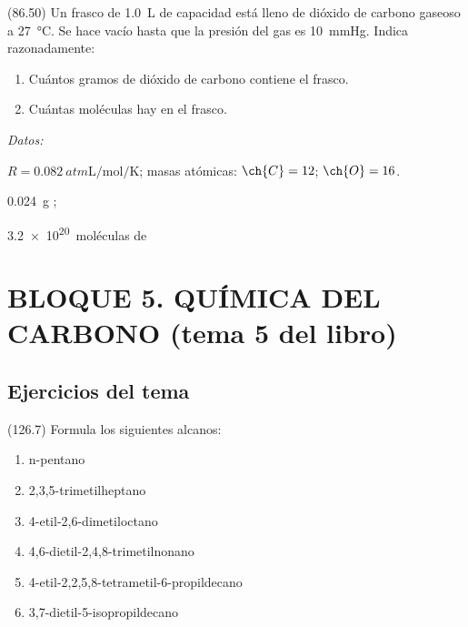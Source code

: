 \documentclass[10pt,a5paper,twoside]{article}
\newenvironment{gexdatos}{
      \vspace{4pt}
      \noindent\small\textit{Datos:}
    }{\vspace{5pt}}
\begin{document}
  \begin{exercise}[
      tags    = {},
      topics  = {química,química básica},
      source  = {FQ 1B MGH 2016, p86, e50},
    ]
    (86.50) Un frasco de \SI{1.0}{\liter} de capacidad está lleno de dióxido de carbono gaseoso a \SI{27}{\celsius}. Se hace vacío hasta que la presión del
    gas es \SI{10}{\mmHg}. Indica razonadamente:

    \begin{enumerate}
      \item Cuántos gramos de dióxido de carbono contiene el frasco.
      \item Cuántas moléculas hay en el frasco.
    \end{enumerate}

    \begin{gexdatos}
      \( R = \SI{0.082}{atm \liter\per\mole\per\kelvin} \); masas atómicas: \( \ch{C} = 12 \); \( \ch{O} = 16 \).
    \end{gexdatos}
  \end{exercise}

  \begin{solution}
    \begin{enumerate*}
      \item \SI{0.024}{\gram} ;
      \item \SI{3.2e20}{moléculas} de 
    \end{enumerate*}
  \end{solution}






\section{BLOQUE 5. QUÍMICA DEL CARBONO (tema 5 del libro)}

\subsection*{Ejercicios del tema}

  \begin{exercise}[
      tags    = {},
      topics  = {química, química orgánica, orgánica},
      source  = {FQ 1B MGH 2016, p126, e7},
    ]
    (126.7) Formula los siguientes alcanos:
    \begin{enumerate}
      \item n-pentano
      \item 2,3,5-trimetilheptano
      \item 4-etil-2,6-dimetiloctano
      \item 4,6-dietil-2,4,8-trimetilnonano
      \item 4-etil-2,2,5,8-tetrametil-6-propildecano
      \item 3,7-dietil-5-isopropildecano
    \end{enumerate}
  \end{exercise}
\end{document}
